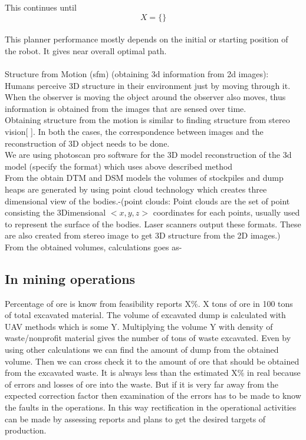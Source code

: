 \documentclass[conference]{IEEEtran}
\begin{document}
This continues until 
\begin{equation} \label{eq:8}
X=\{\}
\end{equation}\\
This planner performance mostly depends on the initial or starting position of the robot. It gives near overall optimal path.\\
\\
Structure from Motion (sfm) (obtaining 3d information from 2d images):\\
Humans perceive  3D structure in their environment just by moving through it. When the observer is moving the object around the observer also moves, thus information is obtained from the images that are sensed over time.\\
Obtaining structure from the motion is  similar to finding structure from stereo vision[ ]. In both the cases, the correspondence between images and the reconstruction of 3D object needs to be done.\\
We are using photoscan pro software for the 3D model reconstruction of the 3d model (specify the format) which uses above described method\\
From the obtain DTM and DSM models the volumes of stockpiles and dump heaps are generated by using point cloud technology which creates three dimensional view of the bodies.-(point clouds: Point clouds are the set of point consisting the 3Dimensional $<x,y,z>$ coordinates for each points, usually used to represent the surface of the bodies. Laser scanners output these formats. These are also created from stereo image to get 3D structure from the 2D images.)
\\
From the obtained volumes, calculations goes as-

\subsection{In mining operations}
Percentage of ore is know from feasibility reports X\%. X tons of ore in 100 tons of total excavated material. The volume of excavated dump is calculated with UAV methods which is some Y. Multiplying the volume Y with density of waste/nonprofit material gives the number of tons of waste excavated. Even by using other calculations we can find the amount of dump from the obtained volume. Then we can cross check it to the amount of ore that should be obtained from the excavated waste. It is always less than the estimated X\% in real because of errors and losses of ore into the waste. But if it is very far away from the expected correction factor then examination of the errors has to be made to know the faults in the operations. In this way rectification in the operational activities can be made by assessing reports and plans to get the desired targets of production.
\end{document}
